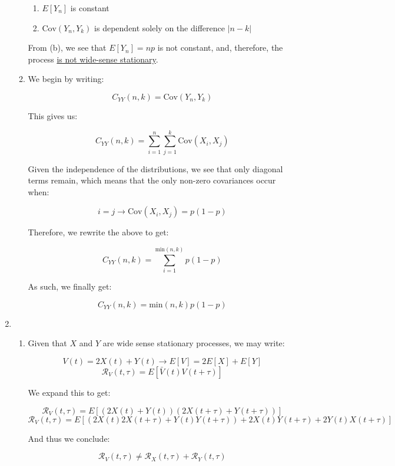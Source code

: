 \begin{enumerate}
\begin{enumerate}
\begin{enumerate}
          \item $E[Y_n]$ is constant

          \item $\text{Cov}(Y_n,Y_k)$ is dependent solely on the difference $|n-k|$

        \end{enumerate}

        From (b), we see that $E[Y_n]=np$ is not constant, and, therefore, the process \underline{is not wide-sense stationary}.

      \item We begin by writing:

        $$C_{YY}(n,k)=\text{Cov}(Y_n,Y_k)$$

        This gives us:

        $$C_{YY}(n,k)=\sum_{i=1}^n\sum_{j=1}^k\text{Cov}(X_i,X_j)$$

        Given the independence of the distributions, we see that only diagonal terms remain, which means that the only non-zero covariances occur when:

        $$i=j\to \text{Cov}(X_i,X_j)=p(1-p)$$

        Therefore, we rewrite the above to get:

        $$C_{YY}(n,k)=\sum_{i=1}^{\text{min}(n,k)} p(1-p)$$

        As such, we finally get:

        $$\boxed{C_{YY}(n,k)=\text{min}(n,k)p(1-p)}$$

    \end{enumerate}

  \item

    \begin{enumerate}

      \item Given that $X$ and $Y$ are wide sense stationary processes, we may write:

        $$V(t)=2X(t)+Y(t)\to E[V]=2E[X]+E[Y]$$
        $$\mathcal{R}_V(t,\tau)=E[\bar{V}(t)V(t+\tau)]$$

        We expand this to get:

        $$\mathcal{R}_V(t,\tau)=E[(2X(t)+Y(t))(2X(t+\tau)+Y(t+\tau))]$$
        $$\mathcal{R}_V(t,\tau)=E[(2X(t)2X(t+\tau)+Y(t)Y(t+\tau))+2X(t)Y(t+\tau)+2Y(t)X(t+\tau)]$$

        And thus we conclude:

        $$\boxed{\mathcal{R}_V(t,\tau)\neq \mathcal{R}_X(t,\tau)+\mathcal{R}_Y(t,\tau)}$$


\end{enumerate}
\end{enumerate}
